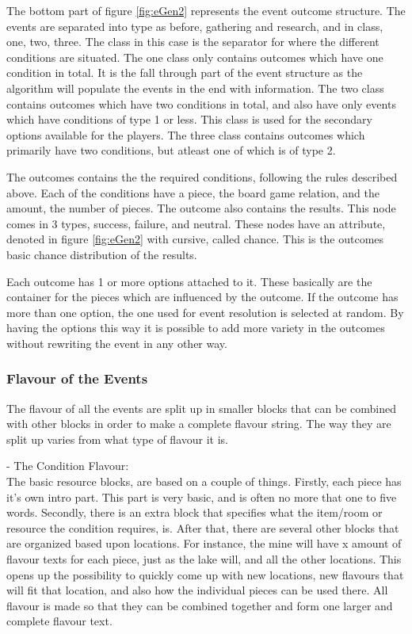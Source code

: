The bottom part of figure \ref{fig:eGen2} represents the event outcome structure. The events are separated into type as before, gathering and research, and in class, one, two, three. 
The class in this case is the separator for where the different conditions are situated. The one class only contains outcomes which have one condition in total. It is the fall through part of the event structure as the algorithm will populate the events in the end with information.
The two class contains outcomes which have two conditions in total, and also have only events which have conditions of type 1 or less. 
This class is used for the secondary options available for the players.
The three class contains outcomes which primarily have two conditions, but atleast one of which is of type 2.

The outcomes contains the the required conditions, following the rules described above. Each of the conditions have a piece, the board game relation, and the amount, the number of pieces. 
The outcome also contains the results. This node comes in 3 types, success, failure, and neutral. These nodes have an attribute, denoted in figure \ref{fig:eGen2} with cursive, called chance. This is the outcomes basic chance distribution of the results. 

Each outcome has 1 or more options attached to it. These basically are the container for the pieces which are influenced by the outcome. If the outcome has more than one option, the one used for event resolution is selected at random. 
By having the options this way it is possible to add more variety in the outcomes without rewriting the event in any other way.

\subsubsection{Flavour of the Events}


The flavour of all the events are split up in smaller blocks that can be combined with other blocks in order to make a complete flavour string. The way they are split up varies from what type of flavour it is. 

- The Condition Flavour:\\

The basic resource blocks, are based on a couple of things. Firstly, each piece has it's own intro part. This part is very basic, and is often no more that one to five words. Secondly, there is an extra block that specifies what the item/room or resource the condition requires, is. After that, there are several other blocks that are organized based upon locations. For instance, the mine will have x amount of flavour texts for each piece, just as the lake will, and all the other locations. This opens up the possibility to quickly come up with new locations, new flavours that will fit that location, and also how the individual pieces can be used there. All flavour is made so that they can be combined together and form one larger and complete flavour text.\\

